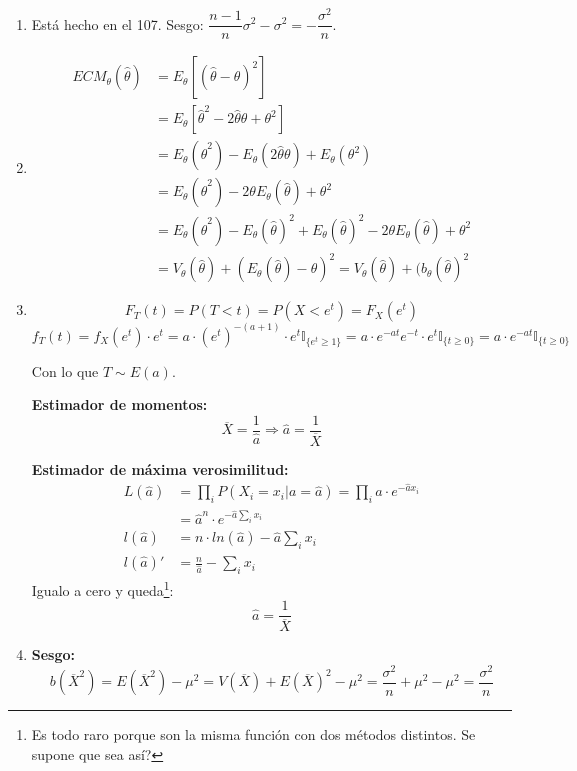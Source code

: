 \begin{enumerate}
	\item
		Está hecho en el 107. Sesgo: $\dfrac{n-1}{n}\sigma^2 - \sigma^2 = -\dfrac{\sigma^2}{n}$.
	\item
		\begin{align*}
			ECM_{\theta}(\hat\theta)	& = E_{\theta} [(\hat\theta - \theta)^2]						\\
										& = E_{\theta} [\hat\theta^2 - 2\hat\theta \theta + \theta^2]	\\
										& = E_{\theta} (\hat\theta^2) - E_{\theta}(2\hat\theta \theta) + E_{\theta}(\theta^2)	\\
										& = E_{\theta} (\hat\theta^2) - 2\theta E_{\theta}(\hat\theta) + \theta^2	\\
										& = E_{\theta} (\hat\theta^2) - E_{\theta}(\hat\theta)^2 + E_{\theta}(\hat\theta)^2 - 2\theta E_{\theta}(\hat\theta) + \theta^2	\\
										& = V_{\theta}(\hat\theta) + (E_{\theta}(\hat\theta)-\theta)^2 = V_{\theta}(\hat\theta) + (b_{\theta}(\hat\theta)^2
		\end{align*}
	
	\item
		$$F_T(t) = P(T<t) = P(X < e^t) = F_X(e^t)$$
		$$f_T(t) = f_X(e^t) \cdot e^t
			= a\cdot (e^t)^{-(a+1)}\cdot e^t \mathbb{I}_{\{e^t \geq 1\}}
			= a\cdot e^{-at} e^{-t} \cdot e^t \mathbb{I}_{\{t \geq 0\}}
			= a\cdot e^{-at} \mathbb{I}_{\{t \geq 0\}}$$
			
		Con lo que $T\sim E(a)$.
		
		\textbf{Estimador de momentos:}
		$$\overline{X} = \frac{1}{\hat a} \Rightarrow \hat a = \frac{1}{\overline X}$$
		
		\textbf{Estimador de máxima verosimilitud:}
		\begin{align*}
			L(\hat a)	& = \prod_i P(X_i = x_i | a = \hat a) = \prod_i \hat a\cdot e^{-\hat a x_i}		\\
						& = \hat a^n \cdot e^{-\hat a \sum_i x_i}										\\
			l(\hat a)	& = n\cdot ln(\hat a) - \hat a \sum_i x_i										\\
			l(\hat a)'	& = \frac{n}{\hat a} - \sum_i x_i
		\end{align*}
		Igualo a cero y queda\footnote{Es todo raro porque son la misma función con dos métodos distintos. Se supone que sea así?}:
		$$\hat a = \frac{1}{\overline X}$$
		
	\item
	\textbf{Sesgo:}
		$$b(\overline X^2) = E(\overline X^2) - \mu^2 = V(\overline X) + E(\overline X)^2 - \mu^2
			= \frac{\sigma^2}{n} + \mu^2 - \mu^2 = \frac{\sigma^2}{n}$$
			

\end{enumerate}
